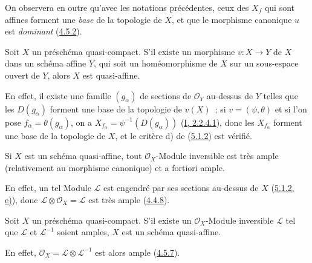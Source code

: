 On observera en outre qu'avec les notations précédentes, ceux des $X_f$ qui
sont affines forment une \emph{base} de la topologie de $X$, et que le
morphisme canonique $u$ est \emph{dominant}
(\hyperref[II.4.5.2-fr]{4.5.2}).

\begin{corollary}[5.1.3]
\label{II.5.1.3-fr}
Soit $X$ un préschéma quasi-compact. S'il existe un morphisme $v:X\to Y$ de
$X$ dans un schéma affine $Y$, qui soit un homéomorphisme de $X$ sur un
sous-espace ouvert de $Y$, alors $X$ est quasi-affine.
\end{corollary}

En effet, il existe une famille $(g_\alpha)$ de sections de $\mathcal{O}_Y$
au-dessus de $Y$ telles que les $D(g_\alpha)$ forment une base de la
topologie de $v(X)$~; si $v=(\psi,\theta)$ et si l'on pose
$f_\alpha=\theta(g_\alpha)$, on a
$X_{f_\alpha}=\psi^{-1}(D(g_\alpha))$
(\hyperref[I.2.2.4.1-fr]{I, 2.2.4.1}), donc les $X_{f_\alpha}$ forment une
base de la topologie de $X$, et le critère d) de
(\hyperref[II.5.1.2-fr]{5.1.2}) est vérifié.

\begin{corollary}[5.1.4]
\label{II.5.1.4-fr}
Si $X$ est un schéma quasi-affine, tout $\mathcal{O}_X$-Module inversible est
très ample (relativement au morphisme canonique) et a fortiori ample.
\end{corollary}

En effet, un tel Module $\mathcal{L}$ est engendré par ses sections au-dessus
de $X$ (\hyperref[II.5.1.2-fr]{5.1.2, e)}), donc
$\mathcal{L}\otimes\mathcal{O}_X=\mathcal{L}$ est très ample
(\hyperref[II.4.4.8-fr]{4.4.8}).

\begin{corollary}[5.1.5]
\label{II.5.1.5-fr}
Soit $X$ un préschéma quasi-compact. S'il existe un $\mathcal{O}_X$-Module
inversible $\mathcal{L}$ tel que $\mathcal{L}$ et $\mathcal{L}^{-1}$ soient
amples, $X$ est un schéma quasi-affine.
\end{corollary}

En effet, $\mathcal{O}_X=\mathcal{L}\otimes\mathcal{L}^{-1}$ est alors ample
(\hyperref[II.4.5.7-fr]{4.5.7}).

